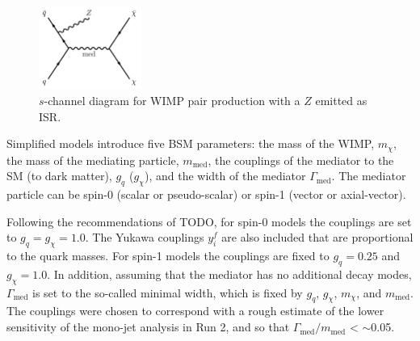 \begin{figure}[htb]
\centering
\includegraphics[width=0.3\textwidth]{Figures/simp.png}
\caption{$s$-channel diagram for WIMP pair production with a $Z$ emitted as ISR.}
\label{fig:simp}
\end{figure}

Simplified models introduce five BSM parameters: the mass of the WIMP, $m_\chi$, the mass of the mediating particle, $m_\text{med}$, the couplings of the mediator to the SM (to dark matter), $g_q$ ($g_\chi$), and the width of the mediator $\Gamma_\text{med}$. The mediator particle can be spin-0 (scalar or pseudo-scalar) or spin-1 (vector or axial-vector). 




Following the recommendations of TODO, for spin-0 models the couplings are set to $g_q = g_\chi = 1.0$. The Yukawa couplings $y_i^f$ are also included that are proportional to the quark masses. For spin-1 models the couplings are fixed to $g_q = 0.25$ and $g_\chi = 1.0$. In addition, assuming that the mediator has no additional decay modes, $\Gamma_\text{med}$ is set to the so-called minimal width, which is fixed by $g_q$, $g_\chi$, $m_\chi$, and $m_\text{med}$. %
The couplings were chosen to correspond with a rough estimate of the lower sensitivity of the mono-jet analysis in Run 2, and so that $\Gamma_\text{med}/m_\text{med}$ < $\sim$0.05.

